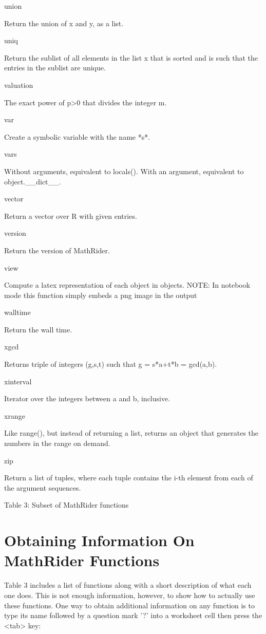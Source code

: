 \documentclass[12pt,oneside]{book}
\begin{document}
union

Return the union of x and y, as a list.

uniq

Return the sublist of all elements in the list x that is sorted and is such that the entries in the sublist are unique.

valuation

The exact power of p{\textgreater}0 that divides the integer m.

var

Create a symbolic variable with the name *s*.

vars

Without arguments, equivalent to locals(). With an argument, equivalent to object.\_\_dict\_\_.

vector

Return a vector over R with given entries.

version

Return the version of MathRider.

view

Compute a latex representation of each object in objects. NOTE: In notebook mode this function simply embeds a png image in the output 

walltime

Return the wall time.

xgcd

Returns triple of integers (g,s,t) such that g = s*a+t*b = gcd(a,b).

xinterval

Iterator over the integers between a and b, inclusive.

xrange

Like range(), but instead of returning a list, returns an object that
generates the numbers in the range on demand.

zip

Return a list of tuples, where each tuple contains the i{}-th element
from each of the argument sequences.

Table 3: Subset of MathRider functions

\section[Obtaining Information On MathRider Functions]{Obtaining Information On MathRider Functions}

Table 3 includes a list of functions along with a short description of what each one does. This is not enough information, however, to show how to actually use these functions. One way to obtain additional information on any function is to type its name followed by a question mark '?' into a worksheet cell then press the {\textless}tab{\textgreater} key: 
\end{document}

